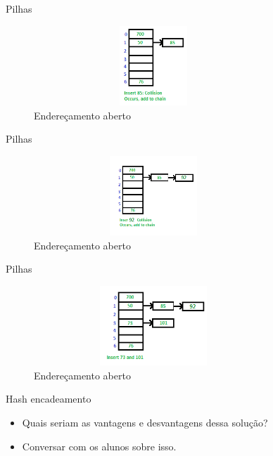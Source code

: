 \begin{frame}
	\begin{block}{Pilhas}
		\begin{figure}[!htb]
			\centering	  				
			\includegraphics[height=3cm, width = 9cm]{./pic/hashChaining14.png}
			\caption{Endereçamento aberto}
			\label{fig_pilha}
		\end{figure}
	\end{block}
\end{frame}

\begin{frame}
	\begin{block}{Pilhas}
		\begin{figure}[!htb]
			\centering	  				
			\includegraphics[height=3cm, width = 9cm]{./pic/hashChaining15.png}
			\caption{Endereçamento aberto}
			\label{fig_pilha}
		\end{figure}
	\end{block}
\end{frame}

\begin{frame}
	\begin{block}{Pilhas}
		\begin{figure}[!htb]
			\centering	  				
			\includegraphics[height=3cm, width = 9cm]{./pic/hashChaining16.png}
			\caption{Endereçamento aberto}
			\label{fig_pilha}
		\end{figure}
	\end{block}
\end{frame}


\begin{frame}
	\begin{block}{Hash encadeamento}
		\begin{itemize}
			\item Quais seriam as vantagens e desvantagens dessa solução?
 
			\item Conversar com os alunos sobre isso.
		\end{itemize}
	\end{block}
\end{frame}

